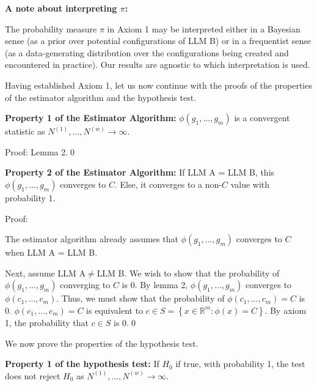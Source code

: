 \documentclass{article}
\begin{document}
\textbf{A note about interpreting $\displaystyle \pi$:}

The probability measure $\displaystyle \pi $ in Axiom 1 may be interpreted either in a Bayesian sense (as a prior over potential configurations of LLM B) or in a frequentist sense (as a data-generating distribution over the configurations being created and encountered in practice). Our results are agnostic to which interpretation is used.



Having established Axiom 1, let us now continue with the proofs of the properties of the estimator algorithm and the hypothesis test.



\textbf{Property 1 of the Estimator Algorithm: }$\displaystyle \phi \left( g_{1} ,...,g_{m}\right)$ is a convergent statistic as $\displaystyle N^{\left( 1\right)} ,...,N^{\left( w\right)}\rightarrow \infty $.

Proof: Lemma 2.\qed 



\textbf{Property 2 of the Estimator Algorithm: }If LLM A = LLM B, this $\displaystyle \phi \left( g_{1} ,...,g_{m}\right)$ converges to $\displaystyle C$. Else, it converges to a non-$\displaystyle C$ value with probability 1.

Proof:

The estimator algorithm already assumes that $\displaystyle \phi \left( g_{1} ,...,g_{m}\right)$ converges to $\displaystyle C$ when LLM A = LLM B.



Next, assume LLM A$\displaystyle \neq $LLM B. We wish to show that the probability of $\displaystyle \phi \left( g_{1} ,...,g_{m}\right)$ converging to $\displaystyle C$ is 0. By lemma 2, $\displaystyle \phi \left( g_{1} ,...,g_{m}\right)$ converges to $\displaystyle \phi \left( c_{1} ,...,c_{m}\right)$. Thus, we must show that the probability of $\displaystyle \phi \left( c_{1} ,...,c_{m}\right) =C$ is 0. $\displaystyle \phi \left( c_{1} ,...,c_{m}\right) =C$ is equivalent to $\displaystyle c\in S=\left\{x\in \mathbb{R}^{m} :\phi \left( x\right) =C\right\}$. By axiom 1, the probability that $\displaystyle c\in S$ is 0.\qed 



We now prove the properties of the hypothesis test.



\textbf{Property 1 of the hypothesis test:} If $\displaystyle H_{0}$ if true, with probability 1, the test does not reject $\displaystyle H_{0}$ as $\displaystyle N^{\left( 1\right)} ,...,N^{\left( w\right)}\rightarrow \infty $.
\end{document}
